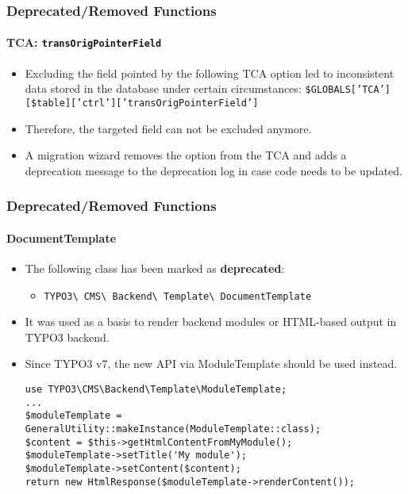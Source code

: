 \begin{frame}[fragile]
	\frametitle{Deprecated/Removed Functions}
	\framesubtitle{TCA: \texttt{transOrigPointerField}}

	\begin{itemize}
		\item Excluding the field pointed by the following TCA option led to
			inconsistent data stored in the database under certain circumstances:
			\small
				\texttt{\$GLOBALS['TCA'][\$table]['ctrl']['transOrigPointerField']}
			\normalsize

		\item Therefore, the targeted field can not be excluded anymore.
		\item A migration wizard removes the option from the TCA and adds a deprecation
			message to the deprecation log in case code needs to be updated.
	\end{itemize}

\end{frame}


\begin{frame}[fragile]
	\frametitle{Deprecated/Removed Functions}
	\framesubtitle{DocumentTemplate}

	\lstset{basicstyle=\tiny\ttfamily}

	\begin{itemize}
		\item The following class has been marked as \textbf{deprecated}:

			\begin{itemize}
				\item \texttt{TYPO3\textbackslash
					CMS\textbackslash
					Backend\textbackslash
					Template\textbackslash
					DocumentTemplate}
			\end{itemize}

		\item It was used as a basis to render backend modules or HTML-based output in TYPO3 backend.
		\item Since TYPO3 v7, the new API via ModuleTemplate should be used instead.

\vspace{-0.4cm}
\begin{lstlisting}
use TYPO3\CMS\Backend\Template\ModuleTemplate;
...
$moduleTemplate = GeneralUtility::makeInstance(ModuleTemplate::class);
$content = $this->getHtmlContentFromMyModule();
$moduleTemplate->setTitle('My module');
$moduleTemplate->setContent($content);
return new HtmlResponse($moduleTemplate->renderContent());
\end{lstlisting}

	\end{itemize}

\end{frame}

